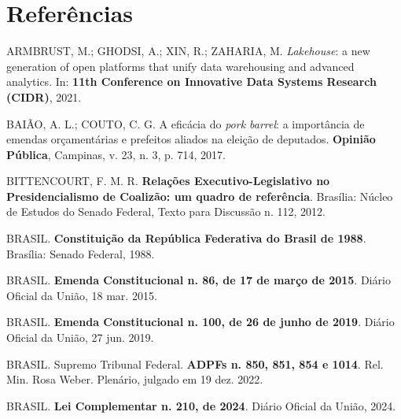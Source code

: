 \documentclass[12pt,a4paper,oneside]{article}
\begin{document}
\section*{Referências}\label{sec:ref}
\begin{singlespace}\small
\noindent\hangindent=1.25cm
ARMBRUST, M.; GHODSI, A.; XIN, R.; ZAHARIA, M.
\textit{Lakehouse}: a new generation of open platforms that unify data
warehousing and advanced analytics. In: \textbf{11th Conference on
Innovative Data Systems Research (CIDR)}, 2021.\par\smallskip

\noindent\hangindent=1.25cm
BAIÃO, A. L.; COUTO, C. G. A eficácia do \textit{pork barrel}: a
importância de emendas orçamentárias e prefeitos aliados na eleição
de deputados. \textbf{Opinião Pública}, Campinas, v. 23, n. 3,
p. 714, 2017.\par\smallskip

\noindent\hangindent=1.25cm
BITTENCOURT, F. M. R. \textbf{Relações Executivo-Legislativo no
Presidencialismo de Coalizão: um quadro de referência}. Brasília:
Núcleo de Estudos do Senado Federal, Texto para Discussão n. 112,
2012.\par\smallskip

\noindent\hangindent=1.25cm
BRASIL. \textbf{Constituição da República Federativa do Brasil de 1988}.
Brasília: Senado Federal, 1988.\par\smallskip

\noindent\hangindent=1.25cm
BRASIL. \textbf{Emenda Constitucional n. 86, de 17 de março de 2015}.
Diário Oficial da União, 18 mar. 2015.\par\smallskip

\noindent\hangindent=1.25cm
BRASIL. \textbf{Emenda Constitucional n. 100, de 26 de junho de 2019}.
Diário Oficial da União, 27 jun. 2019.\par\smallskip

\noindent\hangindent=1.25cm
BRASIL. Supremo Tribunal Federal. \textbf{ADPFs n. 850, 851, 854 e
1014}. Rel. Min. Rosa Weber. Plenário, julgado em 19 dez. 2022.
\par\smallskip

\noindent\hangindent=1.25cm
BRASIL. \textbf{Lei Complementar n. 210, de 2024}. Diário Oficial
da União, 2024.\par\smallskip


\end{singlespace}
\end{document}
